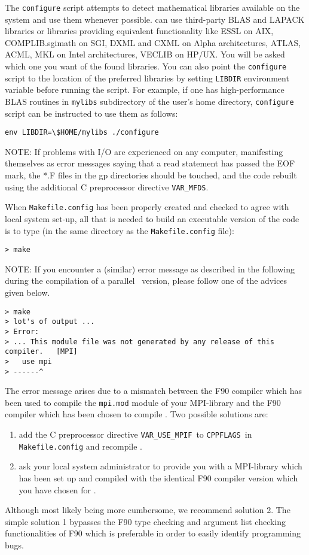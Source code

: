 The \verb|configure| script attempts to detect mathematical libraries
available on the system and use them whenever possible. {\dalton} can
use third-party BLAS and LAPACK libraries or libraries providing
equivalent functionality like ESSL on AIX, COMPLIB.sgimath on SGI,
DXML and CXML on Alpha architectures, ATLAS, ACML, MKL on Intel
architectures, VECLIB on HP/UX.
You will be asked which one you want of the found libraries.
You can also point the \verb|configure|
script to the location of the preferred libraries by setting
\verb|LIBDIR| environment variable before running the script. For
example, if one has high-performance BLAS routines in \verb|mylibs|
subdirectory of the user's home directory, \verb|configure| script can
be instructed to use them as follows:
\begin{verbatim}
env LIBDIR=\$HOME/mylibs ./configure
\end{verbatim}


NOTE: If problems with I/O are experienced on
any computer,
manifesting themselves as error messages saying that a read statement
has passed the EOF mark, the *.F files in the gp directories should be
touched, and the code rebuilt using the additional C preprocessor
directive \verb|VAR_MFDS|.

When  \verb|Makefile.config| has been properly
created and checked
to agree with local system set-up, all that is needed
to build an executable version of the
code is to type
(in the same directory as the \verb|Makefile.config| file):
\begin{verbatim}
> make
\end{verbatim}

NOTE: If you encounter a (similar) error message as described in the following during the 
compilation of a parallel \dalton\ version, please follow one of the advices given below. 
\begin{verbatim}
> make
> lot's of output ...
> Error:
> ... This module file was not generated by any release of this compiler.   [MPI]
>   use mpi
> ------^
\end{verbatim}
The error message arises due to a mismatch between the F90 compiler which 
has been used to compile the \verb|mpi.mod| module of your MPI-library 
and the F90 compiler which has been chosen to compile \dalton. 
Two possible solutions are:
\begin{enumerate}
\item add the C preprocessor directive \verb|VAR_USE_MPIF|\ to \verb|CPPFLAGS|\ in \verb|Makefile.config| 
and recompile \dalton.
\item ask your local system administrator to provide you with a MPI-library which has been 
set up and compiled with the identical F90 compiler version which you have chosen for \dalton.
\end{enumerate}
Although most likely being more cumbersome, we recommend solution 2. The simple solution 1 bypasses the 
F90 type checking and argument list checking functionalities of F90 which is preferable in order to 
easily identify programming bugs.

